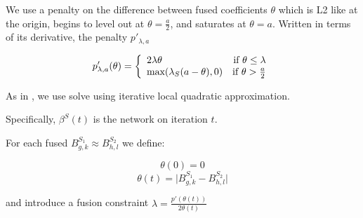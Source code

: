 \documentclass[11pt]{article}
\begin{document}
We use a penalty on the difference between fused coefficients $\theta$ which is L2 like at the origin, begins to level out at $\theta = \frac{a}{2}$, and saturates at $\theta = a$. Written in terms of its derivative, the penalty $p'_{\lambda, a}$

\begin{equation}
p'_{\lambda,a}(\theta) = \left\{
    \begin{array}{lr}
    2\lambda\theta & \text{if } \theta \leq \lambda\\
    \text{max}(\lambda_S(a-\theta),0) & \text{if } \theta > {a \over 2}
    \end{array}
    \right.
\end{equation}




    
As in \cite{fan2001variable}, we use solve using iterative local quadratic approximation. 

Specifically, $\beta^S(t)$ is the network on iteration $t$. 

For each fused $B^{S_1}_{g,k} \approx B^{S_2}_{h,l}$ we define:

\begin{equation} 
\theta(0)=0
\end{equation}
\begin{equation}
\theta(t) = \vert B^{S_1}_{g,k} - B^{S_2}_{h,l} \vert
\end{equation}

and introduce a fusion constraint $\lambda = \frac{p'(\theta(t))}{2\theta(t)} $
\end{document}
